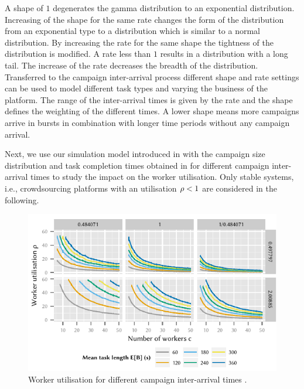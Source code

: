 A shape of \(1\) degenerates the gamma distribution to an exponential distribution.
Increasing of the shape for the same rate changes the form of the distribution from an exponential type to a distribution which is similar to a normal distribution.
By increasing the rate for the same shape the tightness of the distribution is modified.
A rate less than \(1\) results in a distribution with a long tail.
The increase of the rate decreases the breadth of the distribution.
Transferred to the campaign inter-arrival process \campaignIAT different shape and rate settings can be used to model different task types and varying the business of the platform.
The range of the inter-arrival times is given by the rate and the shape defines the weighting of the different times.
A lower shape means more campaigns arrive in bursts in combination with longer time periods without any campaign arrival.

Next, we use our simulation model introduced in  with the campaign size distribution \campaignSize and task completion times \taskDuration obtained in  for different campaign inter-arrival times to study the impact on the worker utilisation. 
Only stable systems, i.e., crowdsourcing platforms with an utilisation \(\rho < 1\) are considered in the following.

\begin{figure}
	\centering
	\includegraphics{cloud/crowdsourcing/numerical_evaluation/figures/parameter_utilization}
	\caption{Worker utilisation \workerUtilization for different campaign inter-arrival times \campaignIAT.}
	\label{fig:cloud:crowdsourcing:performance_evaluation:distributions:parameter_utilization}
\end{figure}

